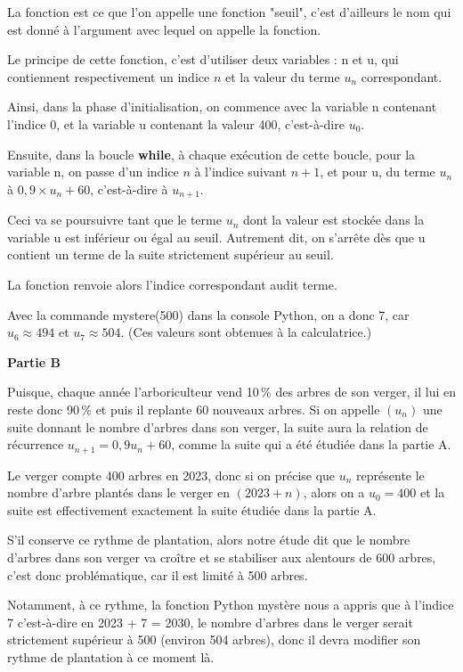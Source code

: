 \documentclass[10pt]{article}
\begin{document}
\begin{enumerate}
\medskip

La fonction est ce que l'on appelle une fonction "seuil", c'est d'ailleurs le nom qui est donné à l'argument avec lequel on appelle la fonction.

Le principe de cette fonction, c'est d'utiliser deux variables : n et u, qui contiennent respectivement un indice $n$ et la valeur du terme $u_n$ correspondant.

Ainsi, dans la phase d'initialisation, on commence avec la variable n contenant l'indice 0, et la variable u contenant la valeur 400, c'est-à-dire $u_0$.

Ensuite, dans la boucle \textbf{while}, à chaque exécution de cette boucle, pour la variable n, on passe d'un indice $n$ à l'indice suivant $n + 1$, et pour u, du terme $u_n$ à $0,9\times u_n + 60$, c'est-à-dire à $u_{n+1}$.

Ceci va se poursuivre tant que le terme $u_n$ dont la valeur est stockée dans la variable u est inférieur ou égal au seuil. Autrement dit, on s'arrête dès que u contient un terme de la suite strictement supérieur au seuil.

La fonction renvoie alors l'indice correspondant audit terme.

Avec la commande mystere(500) dans la console Python, on a donc 7, car $u_6 \approx 494$ et $u_7 \approx 504$. (Ces valeurs sont obtenues à la calculatrice.)
	\end{enumerate}

	\medskip

	\textbf{Partie B}

	\medskip



Puisque, chaque année l'arboriculteur vend 10\,\% des arbres de son verger, il lui en reste donc 90\,\% et puis il replante $60$ nouveaux arbres. Si on appelle $(u_n)$ une suite donnant le nombre d'arbres dans son verger, la suite aura la relation de récurrence $u_{n+1} = 0,9u_n + 60$, comme la suite qui a été étudiée dans la partie A.

Le verger compte $400$ arbres en 2023, donc si on précise que $u_n$ représente le nombre d'arbre plantés dans le verger en $(2023 + n)$, alors on a $u_0 = 400$ et la suite est effectivement exactement la suite étudiée dans la partie A.

S'il conserve ce rythme de plantation, alors notre étude dit que le nombre d'arbres dans son verger va croître et se stabiliser aux alentours de 600 arbres, c'est donc problématique, car il est limité à 500 arbres.

	Notamment, à ce rythme, la fonction Python mystère nous a appris que à l'indice 7 c'est-à-dire en 2023 + 7 = 2030, le nombre d'arbres dans le verger serait strictement supérieur à 500 (environ 504 arbres), donc il devra modifier son rythme de plantation à ce moment là.

\bigskip
\end{document}
